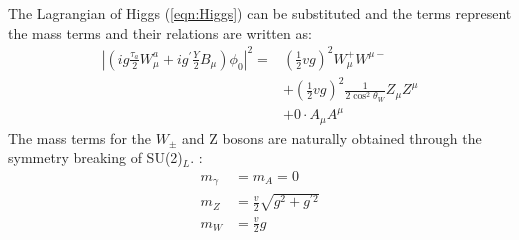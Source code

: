 The Lagrangian of Higgs (\ref{eqn:Higgs}) can be substituted and 
the terms represent the mass terms and their relations are written as:
\begin{equation}
\begin{aligned}
\left|\left(i g \frac{\tau_{a}}{2} W_{\mu}^{a}+i g^{\prime} \frac{Y}{2} B_{\mu}\right) \phi_{0}\right|^2 =&\left(\frac{1}{2} v g\right)^{2} W_{\mu}^{+} W^{\mu-} \\
&+\left(\frac{1}{2} v g\right)^{2} \frac{1}{2 \cos ^{2} \theta_{W}} Z_{\mu} Z^{\mu} \\
&+0 \cdot A_{\mu} A^{\mu}
\end{aligned}
\end{equation}
The mass terms for the $W_\pm$ and Z bosons are naturally obtained through the symmetry breaking of SU(2)$_L$. :
\begin{equation}
\begin{aligned}
m_{\gamma} &=m_{A}=0 \\
m_{Z} &=\frac{v}{2} \sqrt{g^{2}+g^{\prime 2}} \\
m_{W} &=\frac{v}{2} g
\end{aligned}
\end{equation}


